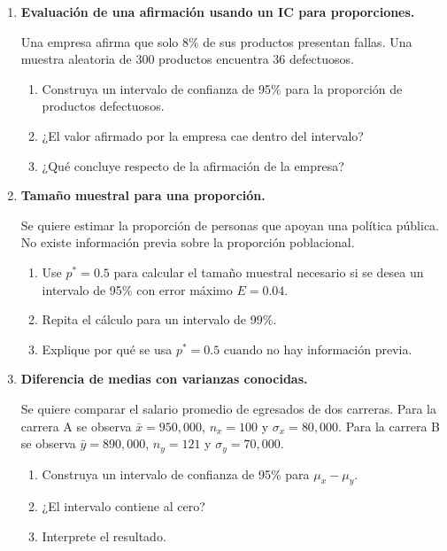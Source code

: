 \documentclass[11pt]{article}
\begin{document}
\begin{enumerate}[label=\textbf{Ejercicio \arabic*.}, leftmargin=*]
    En una encuesta a $n=400$ estudiantes, 256 declaran usar transporte público para llegar a la universidad.
    \begin{enumerate}[label=\alph*)]
        \item Calcule $\hat{p}$.
        \item Verifique si se cumplen las condiciones para usar la aproximación normal.
        \item Construya un intervalo de confianza de 95\% para la proporción poblacional.
        \item Interprete el intervalo.
    \end{enumerate}

    \item \textbf{Evaluación de una afirmación usando un IC para proporciones.}
    
    Una empresa afirma que solo 8\% de sus productos presentan fallas. Una muestra aleatoria de 300 productos encuentra 36 defectuosos.
    \begin{enumerate}[label=\alph*)]
        \item Construya un intervalo de confianza de 95\% para la proporción de productos defectuosos.
        \item ¿El valor afirmado por la empresa cae dentro del intervalo?
        \item ¿Qué concluye respecto de la afirmación de la empresa?
    \end{enumerate}

    \item \textbf{Tamaño muestral para una proporción.}
    
    Se quiere estimar la proporción de personas que apoyan una política pública. No existe información previa sobre la proporción poblacional.
    \begin{enumerate}[label=\alph*)]
        \item Use $p^*=0.5$ para calcular el tamaño muestral necesario si se desea un intervalo de 95\% con error máximo $E=0.04$.
        \item Repita el cálculo para un intervalo de 99\%.
        \item Explique por qué se usa $p^*=0.5$ cuando no hay información previa.
    \end{enumerate}

    \item \textbf{Diferencia de medias con varianzas conocidas.}
    
    Se quiere comparar el salario promedio de egresados de dos carreras. Para la carrera A se observa $\bar{x}=950{,}000$, $n_x=100$ y $\sigma_x=80{,}000$. Para la carrera B se observa $\bar{y}=890{,}000$, $n_y=121$ y $\sigma_y=70{,}000$.
    \begin{enumerate}[label=\alph*)]
        \item Construya un intervalo de confianza de 95\% para $\mu_x-\mu_y$.
        \item ¿El intervalo contiene al cero?
        \item Interprete el resultado.
    \end{enumerate}


\end{enumerate}
\end{document}
